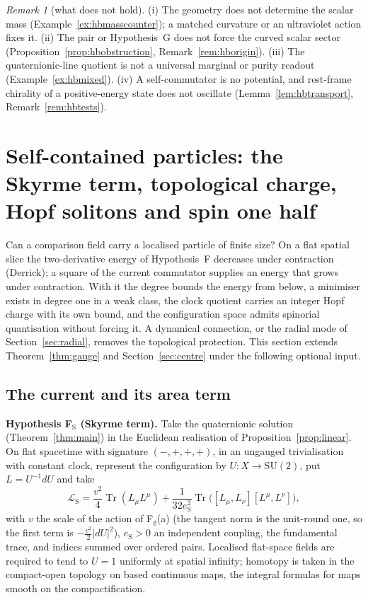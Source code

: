 \documentclass[aps,pra,onecolumn,superscriptaddress,nofootinbib,10pt]{revtex4-2}
\theoremstyle{definition}
\theoremstyle{remark}
\newtheorem{remark}[theorem]{Remark}
\newcommand{\tr}{\operatorname{Tr}}
\newcommand{\SU}{\mathrm{SU}}
\begin{document}
\begin{remark}[what does not hold]\label{rem:hbnogo}
(i) The geometry does not determine the scalar mass (Example~\ref{ex:hbmasscounter}); a matched curvature or an
ultraviolet action fixes it.  (ii) The pair or Hypothesis~G does not force the curved scalar sector
(Proposition~\ref{prop:hbobstruction}, Remark~\ref{rem:hborigin}).  (iii) The quaternionic-line quotient is not a universal
marginal or purity readout (Example~\ref{ex:hbmixed}).  (iv) A self-commutator is no potential, and rest-frame
chirality of a positive-energy state does not oscillate (Lemma~\ref{lem:hbtransport}, Remark~\ref{rem:hbtests}).
\end{remark}

\section{Self-contained particles: the Skyrme term, topological charge, Hopf solitons and spin one half}\label{sec:skyrme}
Can a comparison field carry a localised particle of finite size?  On a flat spatial slice the
two-derivative energy of Hypothesis~F decreases under contraction (Derrick); a square of the current
commutator supplies an energy that grows under contraction.  With it the degree bounds the energy
from below, a minimiser exists in degree one in a weak class, the clock quotient carries an integer
Hopf charge with its own bound, and the configuration space admits spinorial quantisation without
forcing it.  A dynamical connection, or the radial mode of Section~\ref{sec:radial}, removes the
topological protection.  This section extends Theorem~\ref{thm:gauge} and Section~\ref{sec:centre} under the following
optional input.

\subsection{The current and its area term}

\smallskip\noindent\textbf{Hypothesis F$_{\mathrm S}$ (Skyrme term).}  Take the quaternionic solution (Theorem~\ref{thm:main}) in
the Euclidean realisation of Proposition~\ref{prop:linear}.  On flat spacetime with signature $(-,+,+,+)$, in an
ungauged trivialisation with constant clock, represent the configuration by $U\colon X\to\SU(2)$, put
$L=U^{-1}dU$ and take
\begin{equation}\label{eq:skyrmeaction}
\mathcal L_{\mathrm S}=\frac{v^2}{4}\tr(L_\mu L^\mu)+\frac1{32e_{\mathrm S}^2}\tr\bigl([L_\mu,L_\nu][L^\mu,L^\nu]\bigr),
\end{equation}
with $v$ the scale of the action of F$_{\mathrm g}$(a) (the tangent norm is the unit-round one, so the first term is
$-\tfrac{v^2}2\lvert dU\rvert^2$), $e_{\mathrm S}>0$ an independent coupling, the fundamental trace, and indices summed over ordered
pairs.  Localised flat-space fields are required to tend to $U=1$ uniformly at spatial infinity; homotopy
is taken in the compact-open topology on based continuous maps, the integral formulas for maps smooth
on the compactification.
\end{document}
